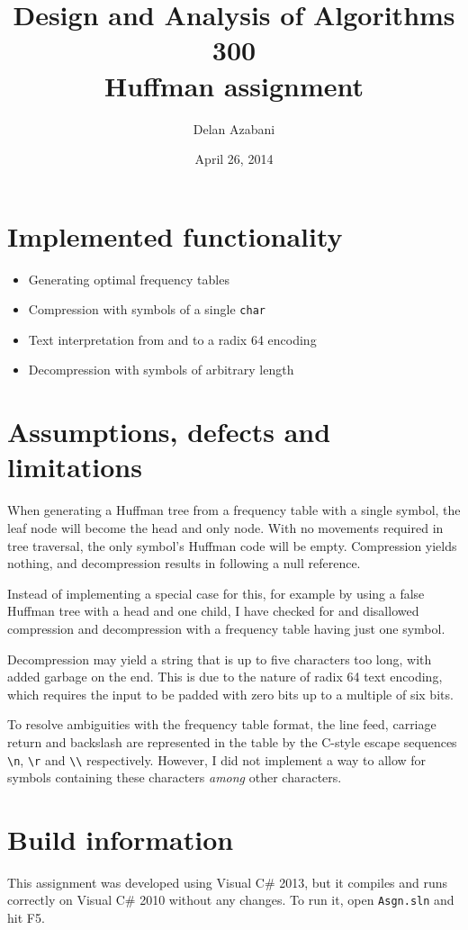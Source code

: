 \documentclass[a4paper,12pt]{article}
\title{Design and Analysis of Algorithms 300\\Huffman assignment}
\date{April 26, 2014}
\author{Delan Azabani}
\begin{document}
\maketitle

\section{Implemented functionality}

\begin{itemize}
	\item Generating optimal frequency tables
	\item Compression with symbols of a single \texttt{char}
	\item Text interpretation from and to a radix 64 encoding
	\item Decompression with symbols of arbitrary length
\end{itemize}

\section{Assumptions, defects and limitations}

When generating a Huffman tree from a frequency table with a single symbol, the
leaf node will become the head and only node. With no movements required in
tree traversal, the only symbol's Huffman code will be empty. Compression
yields nothing, and decompression results in following a null reference.

Instead of implementing a special case for this, for example by using a false
Huffman tree with a head and one child, I have checked for and disallowed
compression and decompression with a frequency table having just one symbol.

Decompression may yield a string that is up to five characters too long, with
added garbage on the end. This is due to the nature of radix 64 text encoding,
which requires the input to be padded with zero bits up to a multiple of six
bits.

To resolve ambiguities with the frequency table format, the line feed, carriage
return and backslash are represented in the table by the C-style escape
sequences \texttt{\textbackslash n}, \texttt{\textbackslash r} and
\texttt{\textbackslash\textbackslash} respectively. However, I did not
implement a way to allow for symbols containing these characters
\emph{among} other characters.

\section{Build information}

This assignment was developed using Visual C\# 2013, but it compiles and
runs correctly on Visual C\# 2010 without any changes. To run it, open
\texttt{Asgn.sln} and hit F5.
\end{document}

